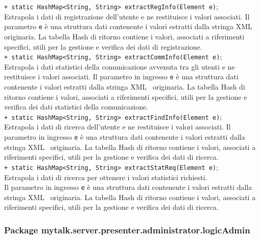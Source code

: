 {{\begin{sloppypar}
{{{\begin{itemize}
{					\texttt{+ static HashMap<String, String> extractRegInfo(Element e)};\\
					Estrapola i dati di registrazione dell'utente e ne restituisce i valori associati.
					Il parametro \texttt{e} è una struttura dati contenente i valori estratti dalla stringa XML\g~ originaria.
					La tabella Hash di ritorno contiene i valori, associati a riferimenti specifici, utili per la gestione e verifica dei dati di registrazione.\\
					
					\texttt{+ static HashMap<String, String> extractCommInfo(Element e)};\\
					Estrapola i dati statistici della comunicazione avvenuta tra gli utenti e ne restituisce i valori associati.
					Il parametro in ingresso \texttt{e} è una struttura dati contenente i valori estratti dalla stringa XML\g~ originaria.
					La tabella Hash di ritorno contiene i valori, associati a riferimenti specifici, utili per la gestione e verifica dei dati statistici della comunicazione.\\
					
					\texttt{+ static HashMap<String, String> extractFindInfo(Element e)};\\
					Estrapola i dati di ricerca dell'utente e ne restituisce i valori associati.
					Il parametro in ingresso \texttt{e} è una struttura dati contenente i valori estratti dalla stringa XML\g~ originaria.
					La tabella Hash di ritorno contiene i valori, associati a riferimenti specifici, utili per la gestione e verifica dei dati di ricerca.\\
					
					\texttt{+ static HashMap<String, String> extractStatReq(Element e)};\\
					Estrapola i dati di ricerca per ottenere i valori statistici richiesti.\\
					Il parametro in ingresso \texttt{e} è una struttura dati contenente i valori estratti dalla stringa XML\g~ originaria.
					La tabella Hash di ritorno contiene i valori, associati a riferimenti specifici, utili per la gestione e verifica dei dati di ricerca.\\
					
				}	
			\end{itemize}
		}

	}
\newpage
	\subsubsection{Package mytalk.server.presenter.administrator.logicAdmin}{
	
}}
\end{sloppypar}}}
